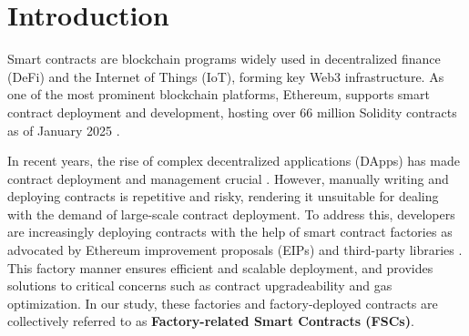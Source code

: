 \documentclass[acmsmall,screen]{acmart}
\begin{document}



	\maketitle

	\section{Introduction}\label{sec:intro}
	Smart contracts \cite{smartcontract} are blockchain programs widely used in decentralized finance (DeFi) and the Internet of Things (IoT), forming key Web3 infrastructure. As one of the most prominent blockchain platforms, Ethereum, \cite{ethereum} supports smart contract deployment and development, hosting over 66 million Solidity contracts as of January 2025 \cite{smart_contract_deployment}.

	In recent years, the rise of complex decentralized applications (DApps) has made contract deployment and management crucial \cite{DBLP:journals/ese/ChenXLGY21,DBLP:conf/wcre/TsiounisK22,DBLP:journals/tse/ZouLKLXFCX21,DBLP:conf/IEEEcloud/NayakNSK18}. However, manually writing and deploying contracts is repetitive and risky, rendering it unsuitable for dealing with the demand of large-scale contract deployment. To address this, developers are increasingly deploying contracts with the help of smart contract factories \cite{factory-contract} as advocated by Ethereum improvement proposals (EIPs) \cite{eip-1014,eip-1167,eip-2470,eip-3171} and third-party libraries \cite{openz-clones,0age-metamorphic,openz-create2,openz-proxyfactory,nft-factory}. This factory manner ensures efficient and scalable deployment, and provides solutions to critical concerns such as contract upgradeability and gas optimization. In our study, these factories and factory-deployed contracts are collectively referred to as \textbf{Factory-related Smart Contracts (FSCs)}.
\end{document}
